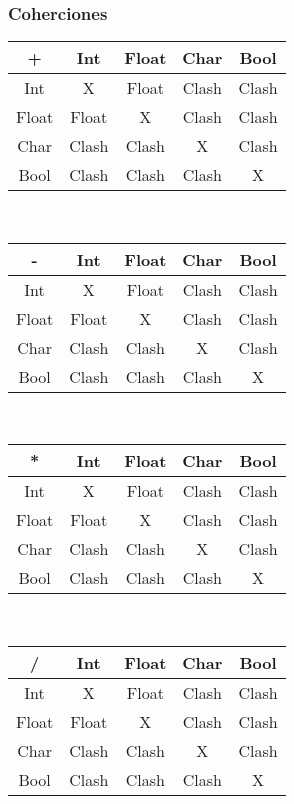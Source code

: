 \documentclass[12pt, spanish]{report}
\begin{document}
\subsubsection{Coherciones}
\begin{tabular}{|c||cccc|}
	\hline
+      &  Int  & Float & Char  & Bool  \\
	\hline \hline
Int    &   X   & Float & Clash & Clash \\
Float  & Float &   X   & Clash & Clash \\
Char   & Clash & Clash &   X   & Clash \\
Bool   & Clash & Clash & Clash &   X   \\
	\hline
\end{tabular}
\\
\begin{tabular}{|c||cccc|}
	\hline
-      &  Int  & Float & Char  & Bool  \\
	\hline \hline
Int    &   X   & Float & Clash & Clash \\
Float  & Float &   X   & Clash & Clash \\
Char   & Clash & Clash &   X   & Clash \\
Bool   & Clash & Clash & Clash &   X   \\
	\hline
\end{tabular}
\\
\begin{tabular}{|c||cccc|}
	\hline
*      &  Int  & Float & Char  & Bool  \\
	\hline \hline
Int    &   X   & Float & Clash & Clash \\
Float  & Float &   X   & Clash & Clash \\
Char   & Clash & Clash &   X   & Clash \\
Bool   & Clash & Clash & Clash &   X   \\
	\hline
\end{tabular}
\\
\begin{tabular}{|c||cccc|}
	\hline
/      &  Int  & Float & Char  & Bool  \\
	\hline \hline
Int    &   X   & Float & Clash & Clash \\
Float  & Float &   X   & Clash & Clash \\
Char   & Clash & Clash &   X   & Clash \\
Bool   & Clash & Clash & Clash &   X   \\
	\hline
\end{tabular}
\end{document}
